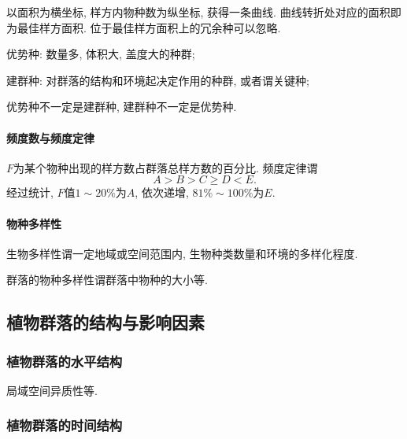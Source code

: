 \documentclass{ctexart}
\begin{document}
以面积为横坐标, 样方内物种数为纵坐标, 获得一条曲线. 曲线转折处对应的面积即为最佳样方面积. 位于最佳样方面积上的冗余种可以忽略.


\begin{cenum}
    \item 优势种: 数量多, 体积大, 盖度大的种群;
    \item 建群种: 对群落的结构和环境起决定作用的种群, 或者谓关键种;
    \item 优势种不一定是建群种, 建群种不一定是优势种.
\end{cenum}

\paragraph{频度数与频度定律} %
\label{par:频度数与频度定律}

$F$为某个物种出现的样方数占群落总样方数的百分比. 频度定律谓
\[ A > B > C \ge D < E. \]
经过统计, $F$值$1\sim 20\%$为$A$, 依次递增, $81\%\sim 100\%$为$E$.


\paragraph{物种多样性} %
\label{par:物种多样性}

生物多样性谓一定地域或空间范围内, 生物种类数量和环境的多样化程度.
\par
群落的物种多样性谓群落中物种的大小等.



\subsection{植物群落的结构与影响因素} %
\label{sub:植物群落的结构与影响因素}

\subsubsection{植物群落的水平结构} %
\label{ssub:植物群落的水平结构}

局域空间异质性等.


\subsubsection{植物群落的时间结构} %
\label{ssub:植物群落的时间结构}
\end{document}
